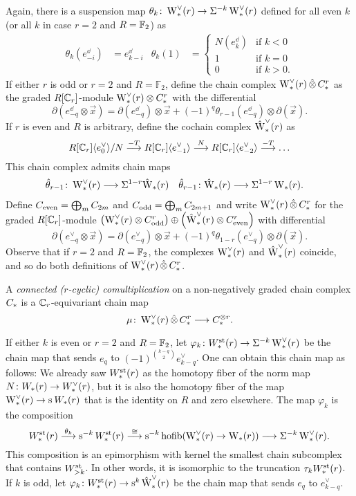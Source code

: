 Again, there is a suspension map $\theta_k\colon \rWd(r)\to \susp{-k}\rWd(r)$ defined for all even $k$ (or all $k$ in case $r=2$ and $R=\bF_2$) as
\begin{align*}
	\theta_k(e_{-i}^\dd) &= e_{k-i}^\dd
	&
	\theta_k(1) &= \begin{cases} N(e_k^\dd) &\text{if $k<0$} \\ 1 &\text{if $k=0$} \\ 0 &\text{if $k>0$.} \end{cases}
\end{align*}
If either $r$ is odd or $r=2$ and $R=\mathbb{F}_2$, define the chain complex $\rWd(r)\hotimes \rucadenas$ as the graded $R[\Cyc_r]$-module $\rWd(r)\otimes \rucadenas$ with the differential
\[
\partial(e^\dd_{-q}\otimes \vec{x}) = \partial (e^\dd_{-q})\otimes \vec{x} + (-1)^q \theta_{r-1}(e^\dd_{-q})\otimes \partial (\vec{x}).
\]
If $r$ is even and $R$ is arbitrary, define the cochain complex $\rWhatd(r)$ as
\[
R[\Cyc_r]\langle e_{0}^\dd\rangle / N \overset{-T}{\lra} R[\Cyc_r]\langle e_{-1}^\dd\rangle \overset{N}{\lra} R[\Cyc_r]\langle e_{-2}^\dd\rangle \overset{-T}{\lra}\ldots
\]
This chain complex admits chain maps
\begin{align*}
    \hat{\theta}_{r-1}\colon \rWd(r)&\lra \susp{1-r}\rWhat(r)
    &
    \hat{\theta}_{r-1}\colon \rWhat(r)&\lra \susp{1-r}\rW(r).
\end{align*}
Define $\ucadenas[\mathrm{even}] = \bigoplus_{m}\ucadenas[2m]$ and $\ucadenas[\mathrm{odd}] = \bigoplus_{m}\ucadenas[2m+1]$ and write $\rWd(r)\hotimes \rucadenas$ for the graded $R[\Cyc_r]$-module $\left(\rWd(r)\otimes \rucadenas[\mathrm{odd}]\right)\oplus \left(\rWhatd(r)\otimes \rucadenas[\mathrm{even}]\right)$ with differential
\[
\partial(e^\vee_{-q}\otimes \vec{x}) = \partial (e^\vee_{-q})\otimes \vec{x} + (-1)^q \theta_{1-r}(e^\vee_{-q})\otimes \partial (\vec{x}).
\]
Observe that if $r=2$ and $R=\bF_2$, the complexes $\rWd(r)$ and $\rWhatd(r)$ coincide, and so do both definitions of $\rWd(r)\hotimes \rucadenas$.
\begin{definition}
	A \emph{connected ($r$-cyclic) comultiplication} on a non-negatively graded chain complex $\ucadenas$ is a $\Cyc_r$-equivariant chain map
	\[
	\mu\colon \rWd(r)\hotimes \rucadenas\lra \ucadenas^{\otimes r}.
	\]
\end{definition}

If either $k$ is even or $r=2$ and $R=\bF_2$, let $\varphi_k\colon \Wst(r)\to \susp{-k}\rWd(r)$ be the chain map that sends $e_q$ to $(-1)^{\binom{k-q}{2}}e_{k-q}^{\vee}$. One can obtain this chain map as follows: We already saw $\Wst(r)$ as the homotopy fiber of the norm map $N\colon \W(r)\to \Wd(r)$, but it is also the homotopy fiber of the map $\rWd(r)\to \sus{}\W(r)$ that is the identity on $R$ and zero elsewhere. The map $\varphi_k$ is the composition
\[
	\Wst(r)\overset{\theta_k}{\lra} \sus{-k} \Wst(r) \overset{\cong}{\lra} \sus{-k}\hofib(\rWd(r)\to \rW(r)) \lra \susp{-k}\rWd(r).
\]
This composition is an epimorphism with kernel the smallest chain subcomplex that contains $\Wst[>k]$. In other words, it is isomorphic to the truncation $\tau_k \Wst(r)$. If $k$ is odd, let $\varphi_k\colon \Wst(r)\to \sus{k}\rWhatd(r)$ be the chain map that sends $e_q$ to $e_{k-q}^{\vee}$.

